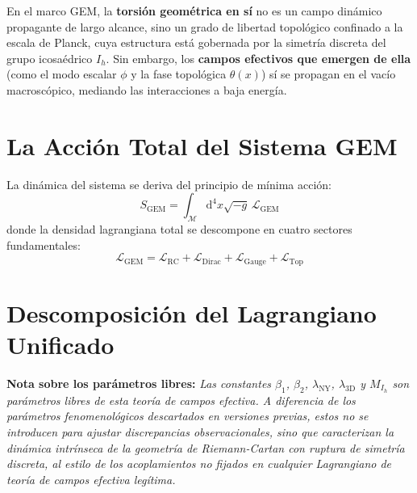 \documentclass[12pt, a4paper]{article}
\newcommand{\diff}{\mathrm{d}}
\begin{document}
En el marco GEM, la \textbf{torsión geométrica en sí} no es un campo dinámico propagante de largo alcance, sino un grado de libertad topológico confinado a la escala de Planck, cuya estructura está gobernada por la simetría discreta del grupo icosaédrico $I_h$. Sin embargo, los \textbf{campos efectivos que emergen de ella} (como el modo escalar $\phi$ y la fase topológica $\theta(x)$) sí se propagan en el vacío macroscópico, mediando las interacciones a baja energía.

\section{La Acción Total del Sistema GEM}

La dinámica del sistema se deriva del principio de mínima acción:
\begin{equation}
    S_{\text{GEM}} = \int_{\mathcal{M}} \diff^4x \sqrt{-g} \, \mathcal{L}_{\text{GEM}}
\end{equation}
donde la densidad lagrangiana total se descompone en cuatro sectores fundamentales:
\begin{equation}
    \boxed{\mathcal{L}_{\text{GEM}} = \mathcal{L}_{\text{RC}} + \mathcal{L}_{\text{Dirac}} + \mathcal{L}_{\text{Gauge}} + \mathcal{L}_{\text{Top}}}
\end{equation}

\section{Descomposición del Lagrangiano Unificado}

\textbf{Nota sobre los parámetros libres:} \textit{Las constantes $\beta_1$, $\beta_2$, $\lambda_{\text{NY}}$, $\lambda_{\text{3D}}$ y $M_{I_h}$ son parámetros libres de esta teoría de campos efectiva. A diferencia de los parámetros fenomenológicos descartados en versiones previas, estos no se introducen para ajustar discrepancias observacionales, sino que caracterizan la dinámica intrínseca de la geometría de Riemann-Cartan con ruptura de simetría discreta, al estilo de los acoplamientos no fijados en cualquier Lagrangiano de teoría de campos efectiva legítima.}
\end{document}

